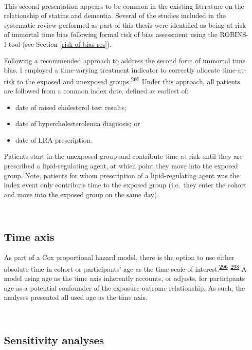\documentclass[a4paper, twoside]{templates/ociamthesis}
\providecommand{\tightlist}{%
  \setlength{\itemsep}{0pt}\setlength{\parskip}{0pt}}
\begin{document}
~

This second presentation appears to be common in the existing literature on the relationship of statins and dementia. Several of the studies included in the systematic review performed as part of this thesis were identified as being at risk of immortal time bias following formal risk of bias assessment using the ROBINS-I tool (see Section \ref{risk-of-bias-res}).

Following a recommended approach to address the second form of immortal time bias, I employed a time-varying treatment indicator to correctly allocate time-at-risk to the exposed and unexposed groups.\textsuperscript{\protect\hyperlink{ref-levesque2010}{295}} Under this approach, all patients are followed from a common index date, defined as earliest of:

\begin{itemize}
\tightlist
\item
  date of raised cholesterol test results;
\item
  date of hypercholesterolemia diagnosis; or
\item
  date of LRA prescription.
\end{itemize}

Patients start in the unexposed group and contribute time-at-risk until they are prescribed a lipid-regulating agent, at which point they move into the exposed group. Note, patients for whom prescription of a lipid-regulating agent was the index event only contribute time to the exposed group (i.e.~they enter the cohort and move into the exposed group on the same day).

~

\hypertarget{cprd-time-axis}{%
\subsection{Time axis}\label{cprd-time-axis}}

As part of a Cox proportional hazard model, there is the option to use either absolute time in cohort or participants' age as the time scale of interest.\textsuperscript{\protect\hyperlink{ref-lamarca1998}{296}--\protect\hyperlink{ref-pencina2007}{298}} A model using age as the time axis inherently accounts, or adjusts, for participants age as a potential confounder of the exposure-outcome relationship. As such, the analyses presented all used age as the time axis.

~

\hypertarget{sensitivity-analyses}{%
\subsection{Sensitivity analyses}\label{sensitivity-analyses}}
\end{document}
